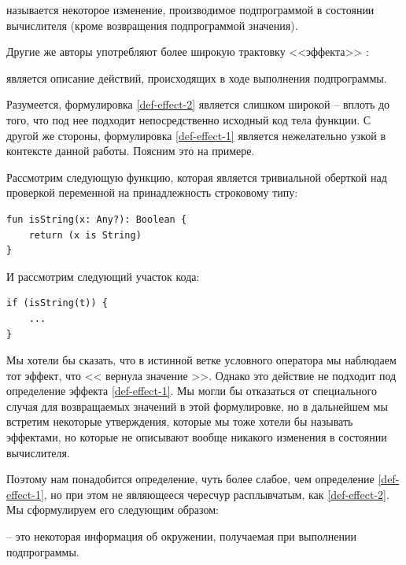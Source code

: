 \begin{definition}
\label{def-effect-1}
     называется некоторое изменение, производимое подпрограммой в состоянии вычислителя (кроме возвращения подпрограммой значения).
\end{definition}

Другие же авторы употребляют более широкую трактовку <<эффекта>> \cite{Nielson99}: 

\begin{definition}
\label{def-effect-2}
     является описание действий, происходящих в ходе выполнения подпрограммы.
\end{definition}

Разумеется, формулировка \ref{def-effect-2} является слишком широкой -- вплоть до того, что под нее подходит непосредственно исходный код тела функции. С другой же стороны, формулировка \ref{def-effect-1} является нежелательно узкой в контексте данной работы. Поясним это на примере. 

Рассмотрим следующую функцию, которая является тривиальной оберткой над проверкой переменной на принадлежность строковому типу:

\begin{verbatim}
fun isString(x: Any?): Boolean {
    return (x is String)
}
\end{verbatim}

И рассмотрим следующий участок кода:

\begin{verbatim}
if (isString(t)) {
    ...
}
\end{verbatim}

Мы хотели бы сказать, что в истинной ветке условного оператора мы наблюдаем тот эффект, что << вернула значение >>. Однако это действие не подходит под определение эффекта \ref{def-effect-1}. Мы могли бы отказаться от специального случая для возвращаемых значений в этой формулировке, но в дальнейшем мы встретим некоторые утверждения, которые мы тоже хотели бы называть эффектами, но которые не описывают вообще никакого изменения в состоянии вычислителя.

Поэтому нам понадобится определение, чуть более слабое, чем определение \ref{def-effect-1}, но при этом не являющееся чересчур расплывчатым, как \ref{def-effect-2}. Мы сформулируем его следующим образом:

\begin{definition}
    \label{def-effect}
     -- это некоторая информация об окружении, получаемая при выполнении подпрограммы.
\end{definition}

